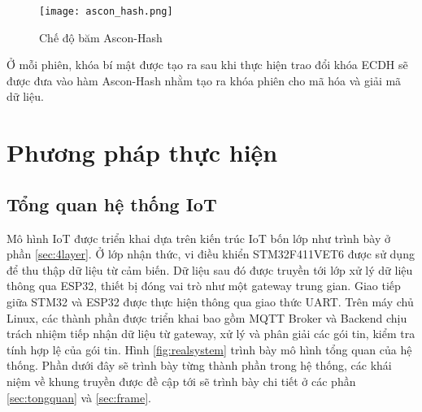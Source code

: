 \begin{figure}[h]
    \centering
    \texttt{[image: ascon\_hash.png]}
    \caption{Chế độ băm Ascon-Hash}
    \label{fig:asconhash}
\end{figure}

Ở mỗi phiên, khóa bí mật được tạo ra sau khi thực hiện trao đổi khóa ECDH sẽ được đưa vào hàm Ascon-Hash nhằm tạo ra khóa phiên cho mã hóa và giải mã dữ liệu.

\section{Phương pháp thực hiện}
\label{sec:phuongphap}
\subsection{Tổng quan hệ thống IoT}
Mô hình IoT được triển khai dựa trên kiến trúc IoT bốn lớp như trình bày ở phần \ref{sec:4layer}. Ở lớp nhận thức, vi điều khiển STM32F411VET6 được sử dụng để thu thập dữ liệu từ cảm biến. Dữ liệu sau đó được truyền tới lớp xử lý dữ liệu thông qua ESP32, thiết bị đóng vai trò như một gateway trung gian. Giao tiếp giữa STM32 và ESP32 được thực hiện thông qua giao thức UART. Trên máy chủ Linux, các thành phần được triển khai bao gồm MQTT Broker và Backend chịu trách nhiệm tiếp nhận dữ liệu từ gateway, xử lý và phân giải các gói tin, kiểm tra tính hợp lệ của gói tin. Hình \ref{fig:realsystem} trình bày mô hình tổng quan của hệ thống. Phần dưới đây sẽ trình bày từng thành phần trong hệ thống, các khái niệm về khung truyền được đề cập tới sẽ trình bày chi tiết ở các phần \ref{sec:tongquan} và \ref{sec:frame}.


